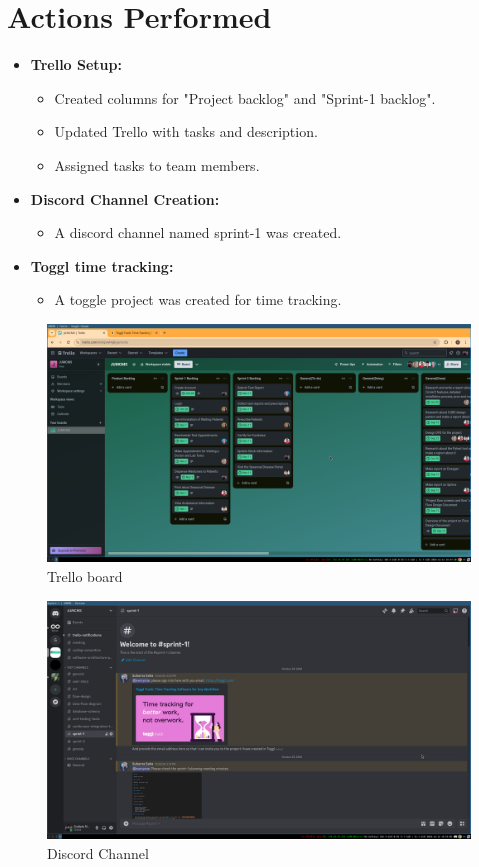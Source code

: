 \documentclass[a4paper,12pt]{article}
\begin{document}
\section{Actions Performed}
\begin{itemize}
    \item \textbf{Trello Setup:}
        \begin{itemize}
            \item Created columns for "Project backlog" and "Sprint-1 backlog".
            \item Updated Trello with tasks and description. 
            \item Assigned tasks to team members.
        \end{itemize}
    \item \textbf{Discord Channel Creation:}
        \begin{itemize}
            \item A discord channel named sprint-1 was created.
        \end{itemize}
    \item \textbf{Toggl time tracking:}
        \begin{itemize}
            \item A toggle project was created for time tracking.
        \end{itemize}
\end{itemize}
\begin{figure}[H]
    \centering
    \includegraphics[width=\textwidth]{images/trello.png}
    \caption{Trello board}
\end{figure}

\begin{figure}[H]
    \centering
    \includegraphics[width=\textwidth]{images/discord.png}
    \caption{Discord Channel}
\end{figure}
\end{document}
